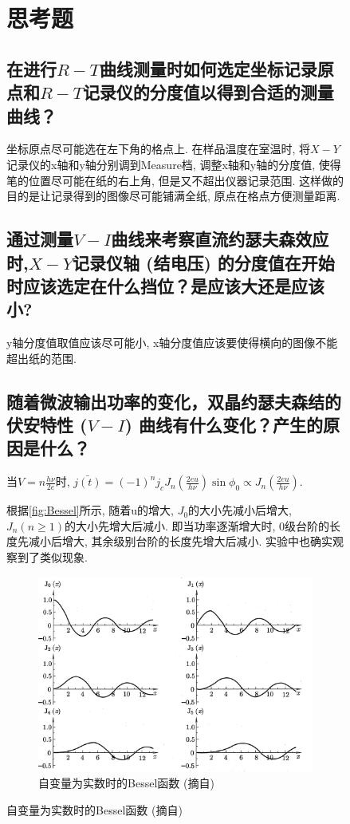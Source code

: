 \documentclass[font=default]{mpltx}
\begin{document}
\begin{figure}[h]


\clearpage %
\appendix %
\section{思考题}\label{app:exercise}
\subsection{在进行$R-T$曲线测量时如何选定坐标记录原点和$R-T$记录仪的分度值以得到合适的测量曲线？}
坐标原点尽可能选在左下角的格点上. 在样品温度在室温时, 将$X-Y$记录仪的x轴和y轴分别调到Measure档, 调整x轴和y轴的分度值, 使得笔的位置尽可能在纸的右上角, 但是又不超出仪器记录范围.
这样做的目的是让记录得到的图像尽可能铺满全纸, 原点在格点方便测量距离.
\subsection{通过测量$V-I$曲线来考察直流约瑟夫森效应时,$X-Y$记录仪轴 (结电压) 的分度值在开始时应该选定在什么挡位？是应该大还是应该小? }
y轴分度值取值应该尽可能小, x轴分度值应该要使得横向的图像不能超出纸的范围. 
\subsection{随着微波输出功率的变化，双晶约瑟夫森结的伏安特性 ($V-I$) 曲线有什么变化？产生的原因是什么？}
当$ V = n\frac{h\nu}{2e}$时, $\bar{j(t)} = (-1)^nj_cJ_n(\frac{2eu}{h\nu})\sin{\phi_0}\propto J_n(\frac{2eu}{h\nu})$.
\par
根据\autoref{fig:Bessel}所示, 随着u的增大, $J_0$的大小先减小后增大, $J_n (n\ge 1)$的大小先增大后减小. 即当功率逐渐增大时, 0级台阶的长度先减小后增大, 其余级别台阶的长度先增大后减小.
实验中也确实观察到了类似现象.
\begin{figure}
    \centering
    \includegraphics[width=0.85\linewidth]{fig/7.png}
    \caption{自变量为实数时的Bessel函数 (摘自\cite{shulifangfa})}
    \label{fig:Bessel}
\end{figure}


\end{figure}
\end{document}
